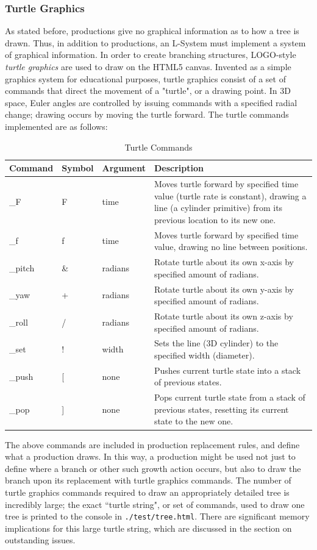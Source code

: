 \documentclass{article}
\newcommand{\tab}{\hspace*{2em}}
\begin{document}
            \subsubsection{Turtle Graphics}
    \tab As stated before, productions give no graphical information as to how a tree is drawn.
Thus, in addition to productions, an L-System must implement a system of graphical information. In
order to create branching structures, LOGO-style \emph{turtle graphics} are used to draw on the HTML5
canvas. Invented as a simple graphics system for educational purposes, turtle graphics consist of a
set of commands that direct the movement of a "turtle", or a drawing point. In 3D space, Euler
angles are controlled by issuing commands with a specified radial change;
drawing occurs by moving the turtle forward. The turtle commands implemented are as follows:

\begin{table}[h]
\centering
\begin{tabular}{|l|l|l|p{7cm}|}
    \hline
    Command & Symbol & Argument & Description \\ \hline \hline
    \_F & F & time & Moves turtle forward by specified time value (turtle rate is constant),
        drawing a line (a cylinder primitive) from its previous location to its new one. \\\hline
    \_f & f & time & Moves turtle forward by specified time value, drawing no line between
        positions. \\\hline
    \_pitch & \& & radians & Rotate turtle about its own x-axis by specified amount of
        radians. \\\hline
    \_yaw & + & radians & Rotate turtle about its own y-axis by specified amount of
        radians. \\\hline
    \_roll & / & radians & Rotate turtle about its own z-axis by specified amount of
        radians. \\\hline
    \_set & ! & width & Sets the line (3D cylinder) to the specified width
        (diameter). \\\hline
    \_push & [ & none & Pushes current turtle state into a stack of previous
        states. \\\hline
    \_pop & ] & none & Pops current turtle state from a stack of previous
        states, resetting its current state to the new one. \\ \hline

\end{tabular}
\caption[Turtle Commands]{Turtle Commands}
\label{tab:turtle}
\end{table}
    \tab The above commands are included in production replacement rules, and define what
a production draws. In this way, a production might be used not just to define where a branch or
other such growth action occurs, but also to draw the branch upon its replacement with turtle
graphics commands. The number of turtle graphics commands required to draw an appropriately
detailed tree is incredibly large; the exact ``turtle string", or set of commands, used to draw one
tree is printed to the console in \verb|./test/tree.html|. There are significant memory
implications for this large turtle string, which are discussed in the section on outstanding issues.
\end{document}
